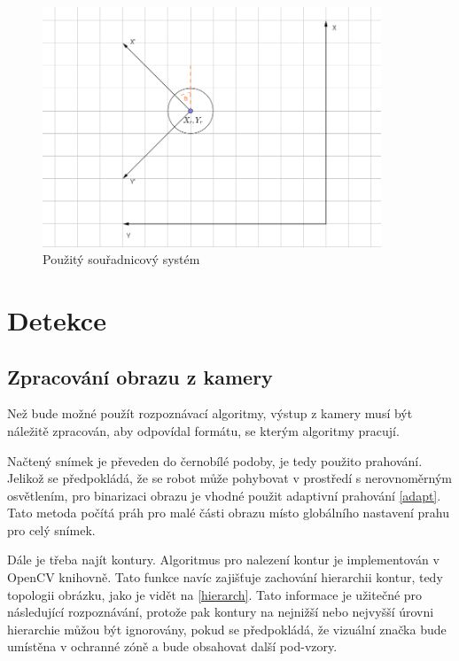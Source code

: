 \documentclass[twoside]{ctuthesis}
\theoremstyle{plain}
\theoremstyle{definition}
\theoremstyle{note}
\begin{document}
\begin{figure}[H]
	\caption{Použitý souřadnicový systém}
	
	\label{ss}
	\includegraphics[width=0.9\textwidth]{images/2/ss.png}
\end{figure}
\chapter{Detekce}

\section{Zpracování obrazu z kamery}

Než bude možné použít rozpoznávací algoritmy, výstup z kamery musí být náležitě zpracován, aby odpovídal formátu, se kterým algoritmy pracují.

Načtený snímek je převeden do černobílé podoby, je tedy použito prahování. Jelikož se předpokládá, že se robot může pohybovat v prostředí s nerovnoměrným osvětlením, pro binarizaci obrazu je vhodné použit adaptivní prahování \ref{adapt}. Tato metoda počítá práh pro malé části obrazu místo globálního nastavení prahu pro celý snímek.

Dále je třeba najít kontury. Algoritmus pro nalezení kontur je implementován v OpenCV knihovně. Tato funkce navíc zajišťuje zachování hierarchii kontur, tedy topologii obrázku, jako je vidět na \ref{hierarch}. Tato informace je užitečné pro následující rozpoznávání, protože pak kontury na nejnižší nebo nejvyšší úrovni hierarchie můžou být ignorovány, pokud se předpokládá, že vizuální značka bude umístěna v ochranné zóně a bude obsahovat další pod-vzory.
\end{document}
